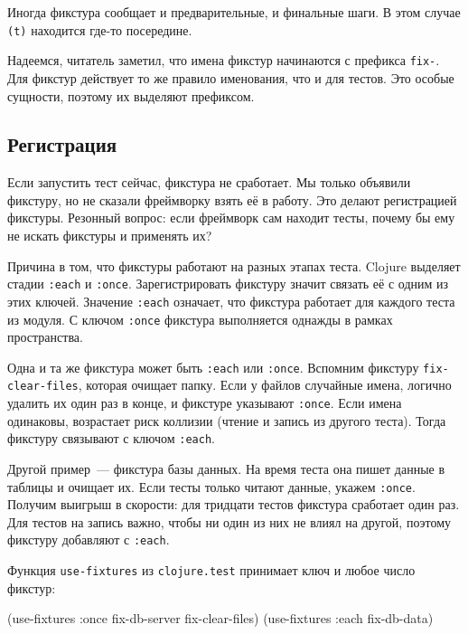 Иногда фикстура сообщает и предварительные, и финальные шаги. В этом случае
\verb|(t)| находится где-то посередине.

Надеемся, читатель заметил, что имена фикстур начинаются с префикса
\verb|fix-|. Для фикстур действует то же правило именования, что и для
тестов. Это особые сущности, поэтому их выделяют префиксом.

\subsection{Регистрация}


Если запустить тест сейчас, фикстура не сработает. Мы только объявили фикстуру,
но не сказали фреймворку взять её в работу. Это делают регистрацией фикстуры.
Резонный вопрос: если фреймворк сам находит тесты, почему бы ему не искать
фикстуры и применять их?

Причина в том, что фикстуры работают на разных этапах теста. Clojure выделяет
стадии \verb|:each| и \verb|:once|. Зарегистрировать фикстуру значит связать
её с одним из этих ключей. Значение \verb|:each| означает, что фикстура
работает для каждого теста из модуля. С ключом \verb|:once| фикстура
выполняется однажды в рамках пространства.


Одна и та же фикстура может быть \verb|:each| или \verb|:once|. Вспомним
фикстуру \verb|fix-clear-files|, которая очищает папку. Если у файлов случайные
имена, логично удалить их один раз в конце, и фикстуре указывают
\verb|:once|. Если имена одинаковы, возрастает риск коллизии (чтение и запись из
другого теста). Тогда фикстуру связывают с ключом \verb|:each|.

Другой пример~--- фикстура базы данных. На время теста она пишет данные в
таблицы и очищает их. Если тесты только читают данные, укажем
\verb|:once|. Получим выигрыш в скорости: для тридцати тестов фикстура
сработает один раз. Для тестов на запись важно, чтобы ни один из них не влиял на
другой, поэтому фикстуру добавляют с \verb|:each|.

Функция \verb|use-fixtures| из \verb|clojure.test| принимает ключ и любое
число фикстур:


\begin{english}
  \begin{clojure}
(use-fixtures :once fix-db-server fix-clear-files)
(use-fixtures :each fix-db-data)
  \end{clojure}
\end{english}

